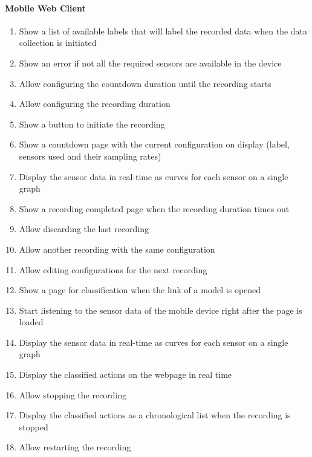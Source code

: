 \paragraph{Mobile Web Client}
\begin{enumerate}[resume*]
    \item Show a list of available labels that will label the recorded data when the data collection is initiated
    \item Show an error if not all the required sensors are available in the device
    \item Allow configuring the countdown duration until the recording starts
    \item Allow configuring the recording duration
    \item Show a button to initiate the recording
    \item Show a countdown page with the current configuration on display (label, sensors used and their sampling rates)
    \item Display the sensor data in real-time as curves for each sensor on a single graph
    \item Show a recording completed page when the recording duration times out
    \item Allow discarding the last recording
    \item Allow another recording with the same configuration
    \item Allow editing configurations for the next recording
    \item Show a page for classification when the link of a model is opened
    \item Start listening to the sensor data of the mobile device right after the page is loaded
    \item Display the sensor data in real-time as curves for each sensor on a single graph
    \item Display the classified actions on the webpage in real time
    \item Allow stopping the recording
    \item Display the classified actions as a chronological list when the recording is stopped
    \item Allow restarting the recording
\end{enumerate}

